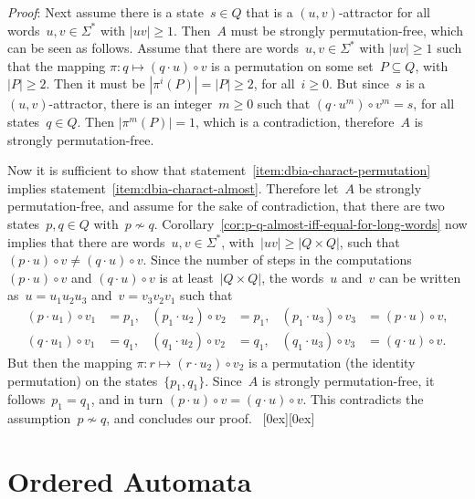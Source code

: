 \documentclass[submission]{eptcs}
\newcommand{\abs}[1]{\left\lvert{#1}\right\rvert}
\newcommand*{\qed}{\raisebox{0.5ex}[0ex][0ex]{\framebox[1ex][l]{}}}
\newenvironment{proof}{\par\noindent
  {\rmfamily\itshape\mdseries Proof\/}:\hspace{\labelsep}\ignorespaces}{\mbox{}\nolinebreak\hfill~{\qed}
  \medbreak
}
\begin{document}
\begin{proof}
  Next assume there is a state~$s\in Q$ that is a $(u,v)$-attractor
  for all words~$u,v\in \Sigma^*$ with $|uv|\geq 1$.  Then~$A$ must be
  strongly permutation-free, which can be seen as follows.  Assume
  that there are words~$u,v\in\Sigma^*$ with $|uv|\geq 1$ such that
  the mapping $\pi\colon q\mapsto (q\cdot u)\circ v$ is a permutation
  on some set~$P\subseteq Q$, with~$\abs P \geq 2$.  Then it must be
  $\abs{\pi^i(P)} = \abs P \geq 2$, for all~$i\geq 0$. But since~$s$
  is a $(u,v)$-attractor, there is an integer~$m\geq 0$ such that
  $(q\cdot u^m)\circ v^m = s$, for all states~$q\in Q$.  Then
  $\abs{\pi^m(P)}=1$, which is a contradiction, therefore~$A$ is
  strongly permutation-free.

  Now it is sufficient to show that
  statement~\ref{item:dbia-charact-permutation} implies
  statement~\ref{item:dbia-charact-almost}.  Therefore let~$A$ be
  strongly permutation-free, and assume for the sake of contradiction,
  that there are two states~$p,q\in Q$ with~$p\nsim q$.
  Corollary~\ref{cor:p-q-almost-iff-equal-for-long-words} now implies
  that there are words~$u,v\in\Sigma^*$, with~$\abs{uv}\geq
  \abs{Q\times Q}$, such that $(p\cdot u)\circ v \neq (q\cdot u)\circ
  v$.
Since the number of steps in the computations $(p\cdot u)\circ v$
  and $(q\cdot u)\circ v$ is at least~$\abs{Q\times Q}$, the words~$u$
  and~$v$ can be written as~$u=u_1u_2u_3$ and~$v=v_3v_2v_1$ such that
  \begin{align*}
    (p\cdot u_1)\circ v_1 &= p_1, & (p_1\cdot u_2)\circ v_2 &= p_1, &
    (p_1\cdot u_3)\circ v_3 &= (p\cdot u)\circ v,\\
    (q\cdot u_1)\circ v_1 &= q_1, & (q_1\cdot u_2)\circ v_2 &= q_1, &
    (q_1\cdot u_3)\circ v_3 &= (q\cdot u)\circ v.
  \end{align*}
  But then the mapping $\pi\colon r\mapsto (r\cdot u_2)\circ v_2$ is a
  permutation (the identity permutation) on the states~$\{p_1,q_1\}$.
  Since~$A$ is strongly permutation-free, it follows~$p_1=q_1$, and in
  turn $(p\cdot u)\circ v = (q\cdot u)\circ v$.  This contradicts the
  assumption~$p\nsim q$, and concludes our proof.
\end{proof}

\section{Ordered Automata}
\label{sec:ordered-automata}
\end{document}
